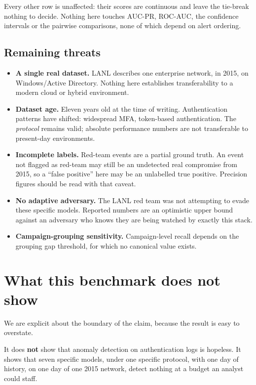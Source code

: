 \documentclass[11pt,a4paper]{article}
\begin{document}
Every other row is unaffected: their scores are continuous and leave the
tie-break nothing to decide. Nothing here touches AUC-PR, ROC-AUC, the confidence
intervals or the pairwise comparisons, none of which depend on alert ordering.

\subsection{Remaining threats}

\begin{itemize}
  \item \textbf{A single real dataset.} LANL describes one enterprise network, in
  2015, on Windows/Active Directory. Nothing here establishes transferability to
  a modern cloud or hybrid environment.

  \item \textbf{Dataset age.} Eleven years old at the time of writing.
  Authentication patterns have shifted: widespread MFA, token-based
  authentication. The \emph{protocol} remains valid; absolute performance numbers
  are not transferable to present-day environments.

  \item \textbf{Incomplete labels.} Red-team events are a partial ground truth.
  An event not flagged as red-team may still be an undetected real compromise
  from 2015, so a ``false positive'' here may be an unlabelled true positive.
  Precision figures should be read with that caveat.

  \item \textbf{No adaptive adversary.} The LANL red team was not attempting to
  evade these specific models. Reported numbers are an optimistic upper bound
  against an adversary who knows they are being watched by exactly this stack.

  \item \textbf{Campaign-grouping sensitivity.} Campaign-level recall depends on
  the grouping gap threshold, for which no canonical value exists.
\end{itemize}

\section{What this benchmark does not show}

We are explicit about the boundary of the claim, because the result is easy to
overstate.

It does \textbf{not} show that anomaly detection on authentication logs is
hopeless. It shows that seven specific models, under one specific protocol, with
one day of history, on one day of one 2015 network, detect nothing at a budget an
analyst could staff.
\end{document}
